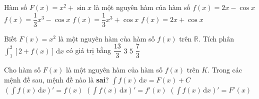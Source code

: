 \begin{ex}%
	Hàm số $F(x)=x^2+\sin x$ là một nguyên  hàm của hàm số
	\choice 
		 {$f(x)=2x-\cos x$}
		{$f(x)=\dfrac{1}{3} x^3-\cos  x$}
		 {$f(x)=\dfrac{1}{3} x^3+\cos x$}
		 {\True $f(x)=2x+\cos x$}
\end{ex}

\begin{ex}%
	Biết $F(x)=x^2$ là một nguyên hàm của hàm số $f(x)$ trên $\mathbb{R}$. Tích  phân $\displaystyle\int_{1}^2{\left[2+f(x)\right] \mathrm{\,d}x}$ có giá trị bằng
	 \choice
		 {$\dfrac{13}{3}$}
		 {$3$}
		 {\True $5$}
		{$\dfrac{7}{3}$} 
\end{ex}

\begin{ex}%
	Cho hàm số $F(x)$ là một nguyên hàm của hàm số $f(x)$ trên $K$.  Trong các mệnh đề sau, mệnh đề nào là \textbf{sai}?
	 \choice
		 {$\displaystyle\int f(x)\mathrm{\,d}x=F(x)+C$}
		{$\left( \displaystyle\int  f(x)\mathrm{\,d}x\right)'=f(x)$}
		{\True $\left(  \displaystyle\int f(x)\mathrm{\,d}x\right)'=f'(x)$}
		{$\left( \displaystyle\int  f(x)\mathrm{\,d}x\right)'=F'(x)$}
\end{ex}
